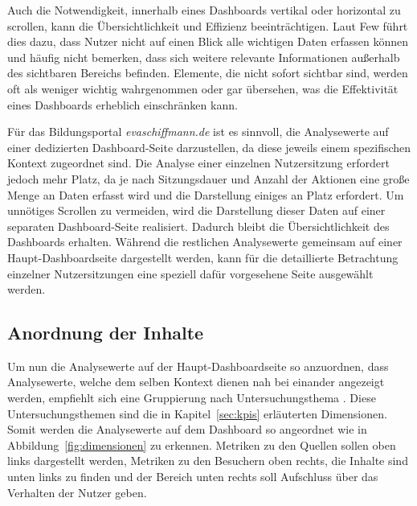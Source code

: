 Auch die Notwendigkeit, innerhalb eines Dashboards vertikal oder horizontal zu scrollen, kann die Übersichtlichkeit und Effizienz beeinträchtigen. Laut Few führt dies dazu, dass Nutzer nicht auf einen Blick alle wichtigen Daten erfassen können und häufig nicht bemerken, dass sich weitere relevante Informationen außerhalb des sichtbaren Bereichs befinden. Elemente, die nicht sofort sichtbar sind, werden oft als weniger wichtig wahrgenommen oder gar übersehen, was die Effektivität eines Dashboards erheblich einschränken kann.\parencite[Kap.3.1.1]{Few2006}

Für das Bildungsportal \textit{evaschiffmann.de} ist es sinnvoll, die Analysewerte auf einer dedizierten Dashboard-Seite darzustellen, da diese jeweils einem spezifischen Kontext zugeordnet sind. Die Analyse einer einzelnen Nutzersitzung erfordert jedoch mehr Platz, da je nach Sitzungsdauer und Anzahl der Aktionen eine große Menge an Daten erfasst wird und die Darstellung einiges an Platz erfordert. Um unnötiges Scrollen zu vermeiden, wird die Darstellung dieser Daten auf einer separaten Dashboard-Seite realisiert. Dadurch bleibt die Übersichtlichkeit des Dashboards erhalten. Während die restlichen Analysewerte gemeinsam auf einer Haupt-Dashboardseite dargestellt werden, kann für die detaillierte Betrachtung einzelner Nutzersitzungen eine speziell dafür vorgesehene Seite ausgewählt werden.

\subsection{Anordnung der Inhalte}
Um nun die Analysewerte auf der Haupt-Dashboardseite so anzuordnen, dass Analysewerte, welche dem selben Kontext dienen nah bei einander angezeigt werden, empfiehlt sich eine Gruppierung nach Untersuchungsthema \parencite[Kap.14.3.1]{Hassler2019}. Diese Untersuchungsthemen sind die in Kapitel~\ref{sec:kpis} erläuterten Dimensionen. Somit werden die Analysewerte auf dem Dashboard so angeordnet wie in Abbildung~\ref{fig:dimensionen} zu erkennen. Metriken zu den Quellen sollen oben links dargestellt werden, Metriken zu den Besuchern oben rechts, die Inhalte sind unten links zu finden und der Bereich unten rechts soll Aufschluss über das Verhalten der Nutzer geben.

